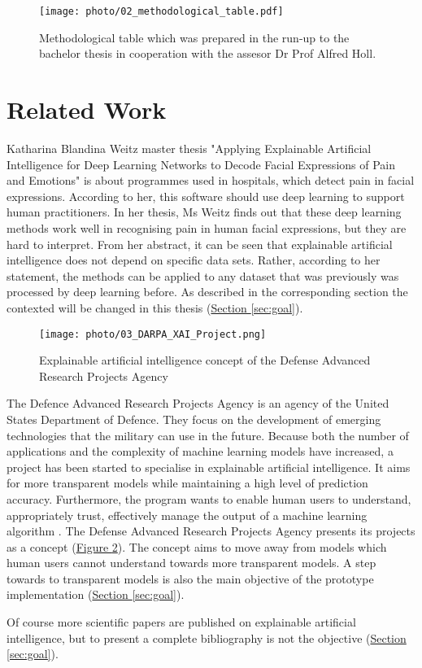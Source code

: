 \begin{figure}[htp]
	\centering
	\texttt{[image: photo/02\_methodological\_table.pdf]}
	\caption{Methodological table  which was prepared in the run-up to the bachelor thesis in cooperation with the assesor Dr Prof Alfred Holl.}
	\label{fig:02_methodological_table}
\end{figure}

\section{Related Work}

Katharina Blandina Weitz master thesis "Applying Explainable Artificial Intelligence for Deep Learning Networks to Decode Facial Expressions of Pain and Emotions" is about programmes used in hospitals, which detect pain in facial expressions. According to her, this software should use deep learning to support human practitioners. In her thesis, Ms Weitz finds out that these deep learning methods work well in recognising pain in human facial expressions, but they are hard to interpret. From her abstract, it can be seen that explainable artificial intelligence does not depend on specific data sets. Rather, according to her statement, the methods can be applied to any dataset that was previously was processed by deep learning before\cite{Weitz2018}. As described in the corresponding section the contexted will be changed in this thesis (\hyperref[sec:goal]{Section \ref{sec:goal}}).\\

\begin{figure}[!htp]
	\centering
	\texttt{[image: photo/03\_DARPA\_XAI\_Project.png]}
	\caption{Explainable artificial intelligence concept of the Defense Advanced Research Projects Agency \cite{Robinson2017}}
	\label{fig:03_DARPA_XAI_Project}
\end{figure}

The Defence Advanced Research Projects Agency is an agency of the United States Department of Defence. They focus on the development of emerging technologies that the military can use in the future. Because both the number of applications and the complexity of machine learning models have increased, a project has been started to specialise in explainable artificial intelligence. It aims for more transparent models while maintaining a high level of prediction accuracy. Furthermore, the program wants to enable human users to understand, appropriately trust, effectively manage the output of a machine learning algorithm  \cite{Robinson2017}. The Defense Advanced Research Projects Agency presents its projects as a concept (\hyperref[fig:03_DARPA_XAI_Project]{Figure \ref{fig:03_DARPA_XAI_Project}}). The concept aims to move away from models which human users cannot understand towards more transparent models. A step towards to transparent models is also the main objective of the prototype implementation (\hyperref[sec:goal]{Section \ref{sec:goal}}).

Of course more scientific papers are published on explainable artificial intelligence, but to present a complete bibliography is not the objective (\hyperref[sec:goal]{Section \ref{sec:goal}}).\\
